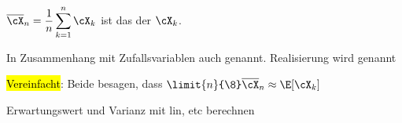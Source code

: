 \shortdefinition $\displaystyle \overline{\cX}_n = \frac{1}{n} \sum_{k = 1}^{n} \cX_k$ ist das  der $\cX_k$.

{\scriptsize \shortterm In Zusammenhang mit Zufallsvariablen auch  genannt. Realisierung wird  genannt}

\shortremark \hl{Vereinfacht}: Beide besagen, dass $\limit{n}{\8} \overline{\cX}_n \approx \E[\cX_k]$

\shortremark Erwartungswert und Varianz mit lin, etc berechnen
